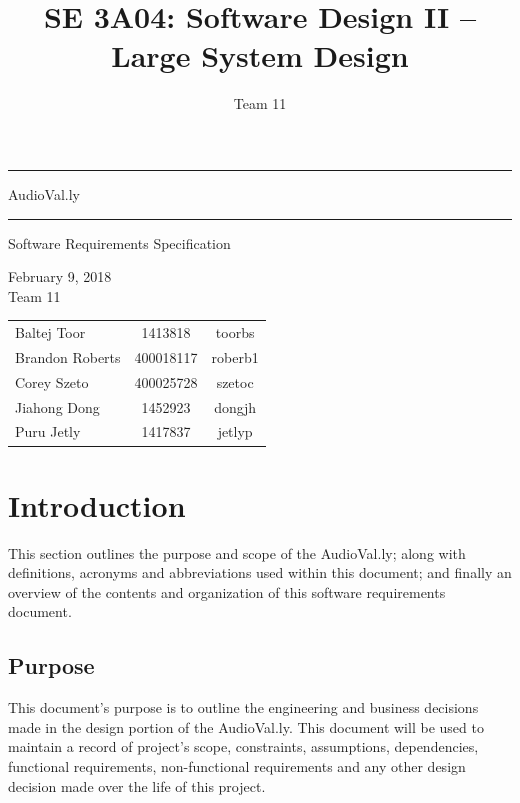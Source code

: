 \documentclass[]{article}
\title{SE 3A04: Software Design II -- Large System Design}
\author{Team 11}
\date{}
\begin{document}
\maketitle
\begin{center}
\hrule
	\vspace{0.2in}
\huge AudioVal.ly
	\vspace{0.05in}
\hrule
	\vspace{0.2in}
\huge  Software Requirements Specification
	\vspace{0.2in}

\large February 9, 2018
\\
	\vspace{1in}
			\large Team 11
\end{center}
\begin{minipage}[c]{\linewidth}
			\large
			\centering
			\begin{tabular}{l c c}
				Baltej Toor & 1413818 & toorbs \\
				Brandon Roberts & 400018117 & roberb1 \\
				Corey Szeto & 400025728 & szetoc \\
				Jiahong Dong & 1452923 & dongjh \\
				Puru Jetly & 1417837 & jetlyp \\
			\end{tabular}
\end{minipage}	
\newpage

\tableofcontents
\newpage
\section{Introduction}
\label{sec:introduction}

This section outlines the purpose and scope of the AudioVal.ly; along with definitions, acronyms and abbreviations used within this document; and finally an overview of the contents and organization of this software requirements document.

\subsection{Purpose}
\label{sub:purpose}
This document's purpose is to outline the engineering and business decisions made in the design portion of the AudioVal.ly. This document will be used to maintain a record of project's scope, constraints, assumptions, dependencies, functional requirements, non-functional requirements and any other design decision made over the life of this project.
\end{document}
